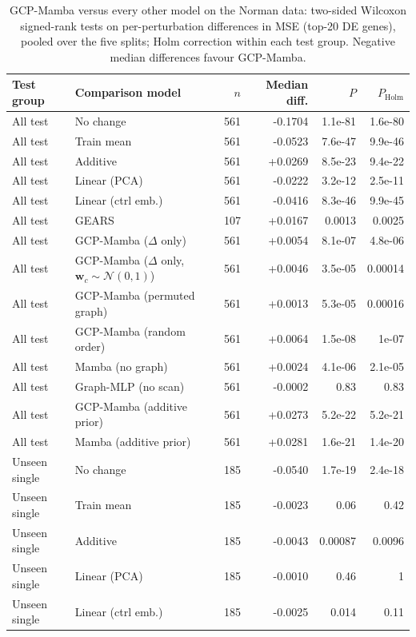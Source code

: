 \begin{longtable}{llrrrr}
\caption{GCP-Mamba versus every other model on the Norman data: two-sided Wilcoxon signed-rank tests on per-perturbation differences in MSE (top-20 DE genes), pooled over the five splits; Holm correction within each test group. Negative median differences favour GCP-Mamba.}\label{tab:tests}\\
\toprule
Test group & Comparison model & $n$ & Median diff. & $P$ & $P_{\mathrm{Holm}}$ \\
\midrule
\endhead
All test & No change & 561 & -0.1704 & 1.1e-81 & 1.6e-80 \\
All test & Train mean & 561 & -0.0523 & 7.6e-47 & 9.9e-46 \\
All test & Additive & 561 & +0.0269 & 8.5e-23 & 9.4e-22 \\
All test & Linear (PCA) & 561 & -0.0222 & 3.2e-12 & 2.5e-11 \\
All test & Linear (ctrl emb.) & 561 & -0.0416 & 8.3e-46 & 9.9e-45 \\
All test & GEARS & 107 & +0.0167 & 0.0013 & 0.0025 \\
All test & GCP-Mamba ($\Delta$ only) & 561 & +0.0054 & 8.1e-07 & 4.8e-06 \\
All test & GCP-Mamba ($\Delta$ only, $\mathbf{w}_c\sim\mathcal{N}(0,1)$) & 561 & +0.0046 & 3.5e-05 & 0.00014 \\
All test & GCP-Mamba (permuted graph) & 561 & +0.0013 & 5.3e-05 & 0.00016 \\
All test & GCP-Mamba (random order) & 561 & +0.0064 & 1.5e-08 & 1e-07 \\
All test & Mamba (no graph) & 561 & +0.0024 & 4.1e-06 & 2.1e-05 \\
All test & Graph-MLP (no scan) & 561 & -0.0002 & 0.83 & 0.83 \\
All test & GCP-Mamba (additive prior) & 561 & +0.0273 & 5.2e-22 & 5.2e-21 \\
All test & Mamba (additive prior) & 561 & +0.0281 & 1.6e-21 & 1.4e-20 \\
\midrule
Unseen single & No change & 185 & -0.0540 & 1.7e-19 & 2.4e-18 \\
Unseen single & Train mean & 185 & -0.0023 & 0.06 & 0.42 \\
Unseen single & Additive & 185 & -0.0043 & 0.00087 & 0.0096 \\
Unseen single & Linear (PCA) & 185 & -0.0010 & 0.46 & 1 \\
Unseen single & Linear (ctrl emb.) & 185 & -0.0025 & 0.014 & 0.11 \\

\end{longtable}
